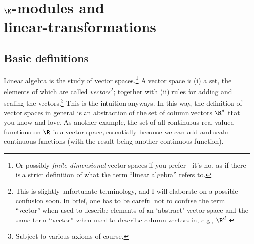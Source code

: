 \chapter{\texorpdfstring{$\K$}{K}-modules and \texorpdfstring{\hfill \\}{} linear-transformations}

\section{Basic definitions}

Linear algebra is the study of vector spaces.\footnote{Or possibly \emph{finite-dimensional} vector spaces if you prefer---it's not as if there is a strict definition of what the term ``linear algebra'' refers to.}  A vector space is (i) a set, the elements of which are called \emph{vectors}\footnote{This is slightly unfortunate terminology, and I will elaborate on a possible confusion soon.  In brief, one has to be careful not to confuse the term ``vector'' when used to describe elements of an `abstract' vector space and the same term ``vector'' when used to describe column vectors in, e.g., $\R ^d$.}; together with (ii) rules for adding and scaling the vectors.\footnote{Subject to various axioms of course.}  This is the intuition anyways.  In this way, the definition of vector spaces in general is an abstraction of the set of column vectors $\R ^d$ that you know and love.  As another example, the set of all continuous real-valued functions on $\R$ is a vector space, essentially because we can add and scale continuous functions (with the result being another continuous function).

